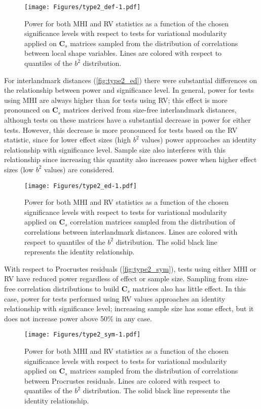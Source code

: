 \documentclass[12pt,twoside]{report}
\begin{document}
\begin{figure}[htbp]
\centering
\texttt{[image: Figures/type2\_def-1.pdf]}
\caption{Power for both MHI and RV statistics as a function of the
chosen significance levels with respect to tests for variational
modularity applied on $\mathbf{C}_s$ matrices sampled from the
distribution of correlations between local shape variables. Lines are
colored with respect to quantiles of the $b^2$ distribution.
\label{fig:type2_def}}
\end{figure}

For interlandmark distances (\autoref{fig:type2_ed}) there were
substantial differences on the relationship between power and
significance level. In general, power for tests using MHI are always
higher than for tests using RV; this effect is more pronounced on
$\mathbf{C}_s$ matrices derived from size-free interlandmark distances,
although tests on these matrices have a substantial decrease in power
for either tests. However, this decrease is more pronounced for tests
based on the RV statistic, since for lower effect sizes (high $b^2$
values) power approaches an identity relationship with significance
level. Sample size also interferes with this relationship since
increasing this quantity also increases power when higher effect sizes
(low $b^2$ values) are considered.

\begin{figure}[htbp]
\centering
\texttt{[image: Figures/type2\_ed-1.pdf]}
\caption{Power for both MHI and RV statistics as a function of the
chosen significance levels with respect to tests for variational
modularity applied on $\mathbf{C}_s$ correlation matrices sampled from
the distribution of correlations between interlandmark distances. Lines
are colored with respect to quantiles of the $b^2$ distribution. The
solid black line represents the identity relationship.
\label{fig:type2_ed}}
\end{figure}

With respect to Procrustes residuals (\autoref{fig:type2_sym}), tests
using either MHI or RV have reduced power regardless of effect or sample
size. Sampling from size-free correlation distributions to build
$\mathbf{C}_s$ matrices also has little effect. In this case, power for
tests performed using RV values approaches an identity relationship with
significance level; increasing sample size has some effect, but it does
not increase power above 50\% in any case.

\begin{figure}[htbp]
\centering
\texttt{[image: Figures/type2\_sym-1.pdf]}
\caption{Power for both MHI and RV statistics as a function of the
chosen significance levels with respect to tests for variational
modularity applied on $\mathbf{C}_s$ matrices sampled from the
distribution of correlations between Procrustes residuals. Lines are
colored with respect to quantiles of the $b^2$ distribution. The solid
black line represents the identity relationship. \label{fig:type2_sym}}
\end{figure}
\end{document}
